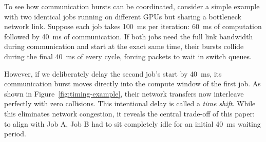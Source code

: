\documentclass[conference]{IEEEtran}
\begin{document}
To see how communication bursts can be coordinated, consider a simple example with two
identical jobs running on different GPUs but sharing a bottleneck network link. Suppose
each job takes 100~ms per iteration: 60~ms of computation followed by 40~ms of
communication. If both jobs need the full link bandwidth during communication and start
at the exact same time, their bursts collide during the final 40~ms of every cycle,
forcing packets to wait in switch queues. 

However, if we deliberately delay the second job's start by 40~ms, its communication
burst moves directly into the compute window of the first job. As shown in
Figure~\ref{fig:timing-example}, their network transfers now interleave perfectly with
zero collisions. This intentional delay is called a \emph{time shift}. While this
eliminates network congestion, it reveals the central trade-off of this paper: to align
with Job A, Job B had to sit completely idle for an initial 40~ms waiting period.
\end{document}

